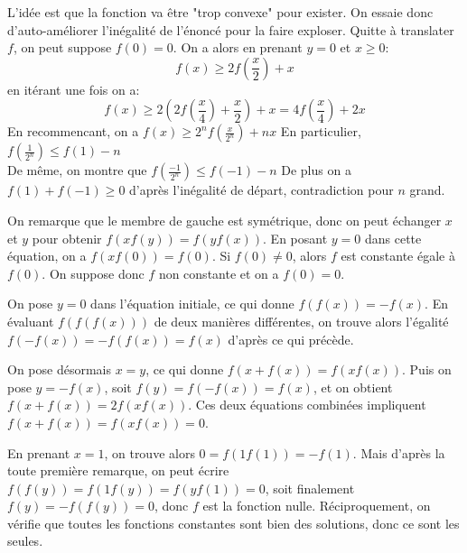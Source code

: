 \begin{sol}
L'idée est que la fonction va être "trop convexe" pour exister. On essaie donc d'auto-améliorer l'inégalité de l'énoncé pour la faire exploser.
Quitte à translater $f$, on peut suppose $f(0)=0$. On a alors en prenant $y=0$ et $x\ge 0$:
$$f(x)\ge 2f\left(\frac{x}{2}\right)+x$$
en itérant une fois on a:
$$f(x)\ge 2\left(2f\left(\frac{x}{4}\right)+\frac{x}{2}\right)+x=4f\left(\frac{x}{4}\right)+2x$$
En recommencant, on a $f(x)\ge 2^n f\left(\displaystyle\frac{x}{2^n}\right)+nx$
En particulier, $f\left(\displaystyle\frac{1}{2^n}\right)\le f(1)-n$\\
De même, on montre que $f\left(\displaystyle\frac{-1}{2^n}\right)\le f(-1)-n$
De plus on a $f(1)+f(-1)\ge 0$ d'après l'inégalité de départ, contradiction pour $n$ grand.
\end{sol}


\begin{sol}
On remarque que le membre de gauche est symétrique, donc on peut échanger $x$ et $y$ pour obtenir $f(xf(y))=f(yf(x))$. En posant $y=0$ dans cette équation, on a $f(xf(0))=f(0)$. Si $f(0)\neq 0$, alors $f$ est constante égale à $f(0)$. On suppose donc $f$ non constante et on a $f(0)=0$.

On pose $y=0$ dans l'équation initiale, ce qui donne $f(f(x))=-f(x)$. En évaluant $f(f(f(x)))$ de deux manières différentes, on trouve alors l'égalité $f(-f(x))=-f(f(x))=f(x)$ d'après ce qui précède.

On pose désormais $x=y$, ce qui donne $f(x+f(x))=f(xf(x))$. Puis on pose $y=-f(x)$, soit $f(y)=f(-f(x))=f(x)$, et on obtient $f(x+f(x))=2f(xf(x))$. Ces deux équations combinées impliquent $f(x+f(x))=f(xf(x))=0$.

En prenant $x=1$, on trouve alors $0=f(1f(1))=-f(1)$. Mais d'après la toute première remarque, on peut écrire $f(f(y))=f(1f(y))=f(yf(1))=0$, soit finalement $f(y)=-f(f(y))=0$, donc $f$ est la fonction nulle. Réciproquement, on vérifie que toutes les fonctions constantes sont bien des solutions, donc ce sont les seules.
\end{sol}


